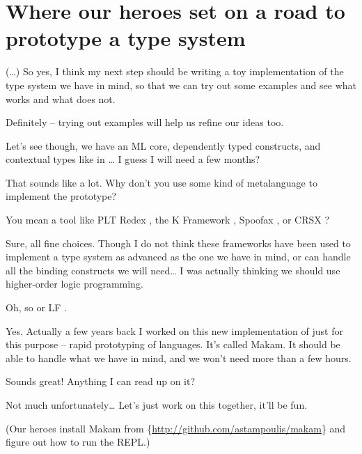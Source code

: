 \section{Where our heroes set on a road to prototype a type
system}\label{where-our-heroes-set-on-a-road-to-prototype-a-type-system}

 (\ldots{}) So yes, I think my next step should be writing a toy
implementation of the type system we have in mind, so that we can try
out some examples and see what works and what does not.

 Definitely -- trying out examples will help us refine our ideas
too.

 Let's see though, we have an ML core, dependently typed
constructs, and contextual types like in
\citet{nanevski2008contextual}\ldots{} I guess I will need a few months?

 That sounds like a lot. Why don't you use some kind of
metalanguage to implement the prototype?

 You mean a tool like PLT Redex \citep{felleisen2009semantics},
the K Framework \citep{rosu2010overview,ellison2009rewriting}, Spoofax
\citep{kats2010spoofax}, or CRSX \citep{rose2011crsx}?

 Sure, all fine choices. Though I do not think these frameworks
have been used to implement a type system as advanced as the one we have
in mind, or can handle all the binding constructs we will need\ldots{} I
was actually thinking we should use higher-order logic programming.

 Oh, so \lamprolog \citep{miller1988overview} or LF
\citep{pfenning1999system}.

 Yes. Actually a few years back I worked on this new implementation
of \lamprolog
just for this purpose -- rapid prototyping of languages. It's called
Makam. It should be able to handle what we have in mind, and we won't
need more than a few hours.

 Sounds great! Anything I can read up on it?

 Not much unfortunately\ldots{} Let's just work on this together,
it'll be fun.

(Our heroes install Makam from
\if@ACM@anonymous\{\url{http://github.com/astampoulis/makam}\}\fi\xspace
and figure out how to run the REPL.)
